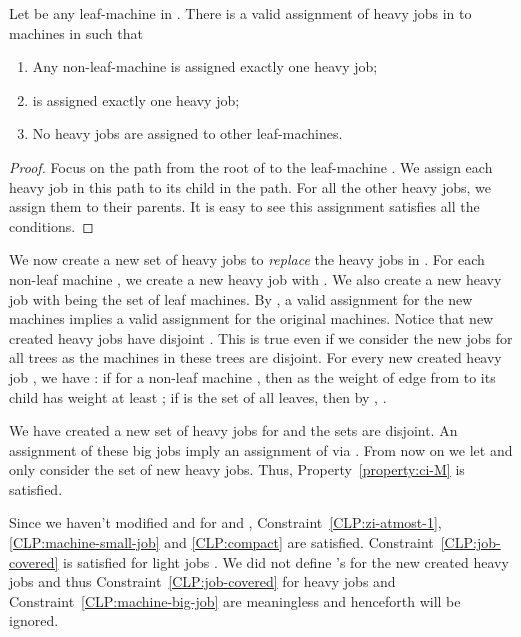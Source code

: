 \documentclass[11pt]{article}
\newcounter{prop}
\begin{document}
\begin{lemma}
\label{lemma:choose-any-leaf-machine}
\label{lem:choose-any-leaf-machine}

Let  be any leaf-machine in . There is a valid assignment of heavy jobs in  to machines in  such that
\begin{enumerate}[itemsep=-2pt]
\item Any non-leaf-machine is assigned exactly one heavy job;
\item  is assigned exactly one heavy job;
\item No heavy jobs are assigned to other leaf-machines.
\end{enumerate}
\end{lemma}
\begin{proof}
Focus on the path from the root of  to the leaf-machine .  We assign each heavy job in this path to its child in the path.  For all the other heavy jobs, we assign them to their parents.  It is easy to see this assignment satisfies all the conditions.
\end{proof}
We now create a new set of heavy jobs to \emph{replace} the heavy jobs in .  For each non-leaf machine , we create a new heavy job  with . We also create a new heavy job  with  being the set of leaf machines.  By , a valid assignment for the new machines implies a valid assignment for the original machines.  Notice that new created heavy jobs  have disjoint . This is true even if we consider the new jobs for all trees  as the machines in these trees are disjoint. For every new created heavy job , we have : if  for a non-leaf machine , then  as the weight of edge from  to its child has weight at least ; if  is the set of all leaves, then by , . 

We have created a new set  of heavy jobs for  and the sets  are disjoint. An assignment of these big jobs imply an assignment of  via . From now on we let  and only consider the set of new heavy jobs. Thus, Property~\ref{property:ci-M} is satisfied.  

Since we haven't modified  and  for  and , Constraint~\eqref{CLP:zi-atmost-1}, \eqref{CLP:machine-small-job} and \eqref{CLP:compact} are satisfied. Constraint~\eqref{CLP:job-covered} is satisfied for light jobs . We did not define 's for the new created heavy jobs  and thus Constraint~\eqref{CLP:job-covered} for heavy jobs  and Constraint~\eqref{CLP:machine-big-job} are meaningless and henceforth will be ignored. 
\end{document}
